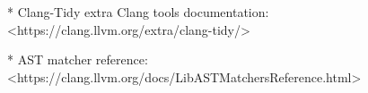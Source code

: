 
\begin{markdown}
* Clang-Tidy extra Clang tools documentation: <https://clang.llvm.org/extra/clang-tidy/>

* AST matcher reference: <https://clang.llvm.org/docs/LibASTMatchersReference.html>
\end{markdown}

